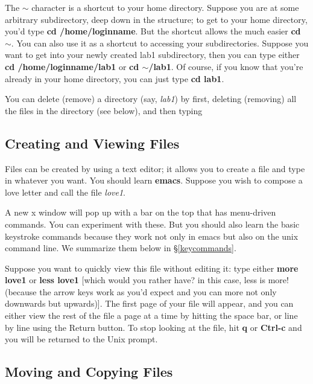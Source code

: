 	The \textbf{$\sim$} character is a shortcut to your home
directory.  Suppose you are at some arbitrary subdirectory, deep down in
the structure; to get to your home directory, you'd type \textbf{cd
/home/loginname}.  But the shortcut allows the much easier \textbf{cd
$\sim$}.  You can also use it as a shortcut to accessing your
subdirectories.  Suppose you want to get into your newly created lab1
subdirectory, then you can type either \textbf{cd /home/loginname/lab1}
or \textbf{cd $\sim$/lab1}.  Of course, if you know that you're already
in your home directory, you can just type {\bf cd lab1}. 

	You can delete (remove) a directory (say, {\it lab1}) by first,
deleting (removing) all the files in the directory (see below), and then
typing


\subsection{Creating and Viewing Files}\label{files}

	Files can be created by using a text editor; it allows you to
create a file and type in whatever you want.  You should
learn {\bf emacs}.  Suppose you wish to compose a love letter and call
the file {\it love1}.  
	

A new x window will pop up with a bar on the top that has menu-driven
commands. You can experiment with these. But you should also learn the
basic keystroke commands because they work not only in emacs but also on
the unix command line. We summarize them below in \S \ref{keycommands}. 

	Suppose you want to quickly view this file without editing it:
type either {\bf more love1} or {\bf less love1} [which would you rather
have? in this case, less is more! (because the arrow keys work as you'd
expect and you can more not only downwards but upwards)].  The first
page of your file will appear, and you can either view the rest of the
file a page at a time by hitting the space bar, or line by line using
the Return button.  To stop looking at the file, hit {\bf q} or {\bf
Ctrl-c} and you will be returned to the Unix prompt. 

\subsection{Moving and Copying Files}\label{movecopy}

